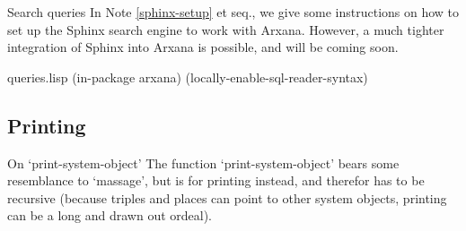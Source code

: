 \begin{notate}{Search queries}
In Note \ref{sphinx-setup} et seq., we give some
instructions on how to set up the Sphinx search engine to
work with Arxana.  However, a much tighter integration of
Sphinx into Arxana is possible, and will be coming soon.
\end{notate}

\begin{common}{queries.lisp}
(in-package arxana)
(locally-enable-sql-reader-syntax)
\end{common}

\subsection*{Printing}

\begin{notate}{On `print-system-object'} \label{print-system-object}
The function `print-system-object' bears some resemblance
to `massage', but is for printing instead,
and therefor has to be recursive (because triples and
places can point to other system objects, printing can be
a long and drawn out ordeal).
\end{notate}

